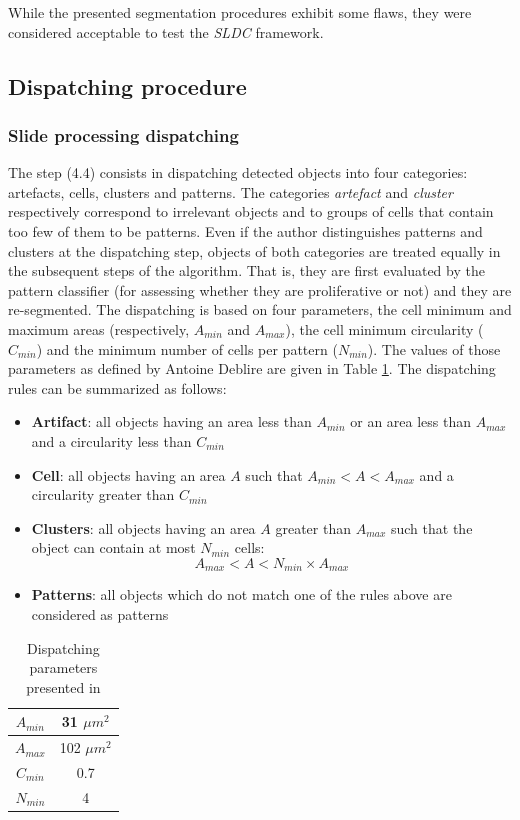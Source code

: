 While the presented segmentation procedures exhibit some flaws, they were considered acceptable to test the \textit{SLDC} framework. 

\subsection{Dispatching procedure}
\label{ssec:thyroid_ad_dispatch}

\subsubsection{Slide processing dispatching}

The step (4.4) consists in dispatching detected objects into four categories: artefacts, cells, clusters and patterns. The categories \textit{artefact} and \textit{cluster} respectively correspond to irrelevant objects and to groups of cells that contain too few of them to be patterns. Even if the author distinguishes patterns and clusters at the dispatching step, objects of both categories are treated equally in the subsequent steps of the algorithm. That is, they are first evaluated by the pattern classifier (for assessing whether they are proliferative or not) and they are re-segmented. The dispatching is based on four parameters, the cell minimum and maximum areas (respectively, $A_{min}$ and $A_{max}$), the cell minimum circularity ($C_{min}$) and the minimum number of cells per pattern ($N_{min}$). The values of those parameters as defined by Antoine Deblire are given in Table \ref{tab:adeb_disp_rules}. The dispatching rules can be summarized as follows:

\begin{itemize}
	\item \textbf{Artifact}: all objects having an area less than $A_{min}$ or an area less than $A_{max}$ and a circularity less than $C_{min}$
	\item \textbf{Cell}: all objects having an area $A$ such that $A_{min} < A < A_{max}$ and a circularity greater than $C_{min}$
	\item \textbf{Clusters}: all objects having an area $A$ greater than $A_{max}$ such that the object can contain at most $N_{min}$ cells:
	\[
		A_{max} < A < N_{min} \times A_{max}
	\]
	\item \textbf{Patterns}: all objects which do not match one of the rules above are considered as patterns
\end{itemize}

\begin{table}
	\center
	\begin{tabular}{|c|c|}
		\hline
		$A_{min}$ & 31 $\mu m^2$\\
		\hline
		$A_{max}$ & 102 $\mu m^2$\\
		\hline
		$C_{min}$ & 0.7 \\
		\hline
		$N_{min}$ & 4\\
		\hline
	\end{tabular}
	\caption{Dispatching parameters presented in \cite{adeblire2013}}
	\label{tab:adeb_disp_rules}
\end{table}

